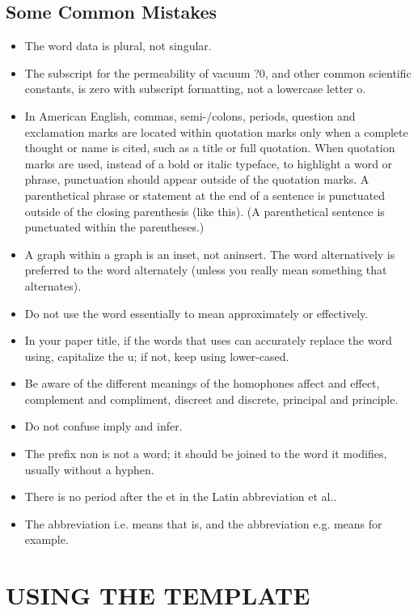 \documentclass[letterpaper, 10 pt, conference]{ieeeconf}  %
\begin{document}
	\subsection{Some Common Mistakes}
	\begin{itemize}
		
		
		\item The word data is plural, not singular.
		\item The subscript for the permeability of vacuum ?0, and other common scientific constants, is zero with subscript formatting, not a lowercase letter o.
		\item In American English, commas, semi-/colons, periods, question and exclamation marks are located within quotation marks only when a complete thought or name is cited, such as a title or full quotation. When quotation marks are used, instead of a bold or italic typeface, to highlight a word or phrase, punctuation should appear outside of the quotation marks. A parenthetical phrase or statement at the end of a sentence is punctuated outside of the closing parenthesis (like this). (A parenthetical sentence is punctuated within the parentheses.)
		\item A graph within a graph is an inset, not aninsert. The word alternatively is preferred to the word alternately (unless you really mean something that alternates).
		\item Do not use the word essentially to mean approximately or effectively.
		\item In your paper title, if the words that uses can accurately replace the word using, capitalize the u; if not, keep using lower-cased.
		\item Be aware of the different meanings of the homophones affect and effect, complement and compliment, discreet and discrete, principal and principle.
		\item Do not confuse imply and infer.
		\item The prefix non is not a word; it should be joined to the word it modifies, usually without a hyphen.
		\item There is no period after the et in the Latin abbreviation et al..
		\item The abbreviation i.e. means that is, and the abbreviation e.g. means for example.
		
	\end{itemize}
	
	
	\section{USING THE TEMPLATE}
	
\end{document}
